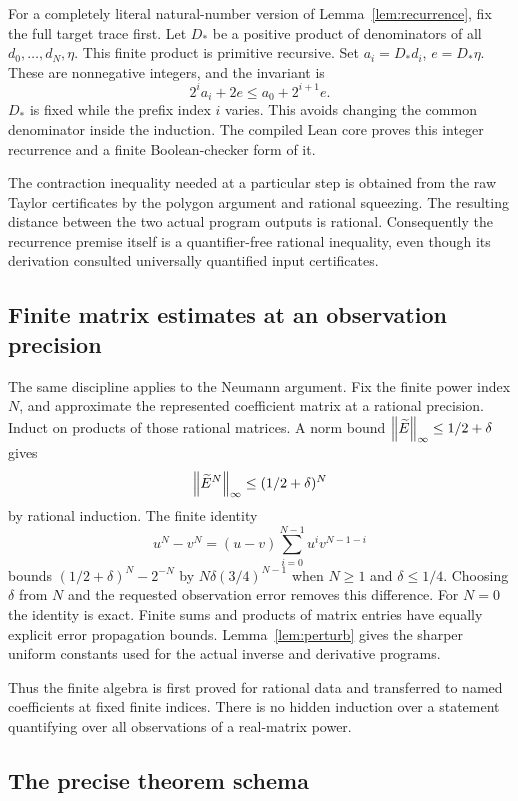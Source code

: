 For a completely literal natural-number version of
Lemma~\ref{lem:recurrence}, fix the full target trace first.
Let \(D_*\) be a positive product of denominators of all
\(d_0,\ldots,d_N,\eta\). This finite product is primitive
recursive. Set \(a_i=D_*d_i\), \(e=D_*\eta\).
These are nonnegative integers, and the invariant is
\[
 2^i a_i+2e\le a_0+2^{i+1}e.
 \tag{Integer invariant}
\]
\(D_*\) is fixed while the prefix index \(i\) varies.
This avoids changing the common denominator inside the
induction. The compiled Lean core proves this integer
recurrence and a finite Boolean-checker form of it.

The contraction inequality needed at a particular step is
obtained from the raw Taylor certificates by the polygon
argument and rational squeezing. The resulting distance
between the two actual program outputs is rational.
Consequently the recurrence premise itself is a
quantifier-free rational inequality, even though its
derivation consulted universally quantified input
certificates.

\subsection{Finite matrix estimates at an observation precision}

The same discipline applies to the Neumann argument.
Fix the finite power index \(N\), and approximate the
represented coefficient matrix at a rational precision.
Induct on products of those rational matrices. A norm
bound \(\left\lVert\widetilde E\right\rVert_\infty\le1/2+\delta\) gives
\[
 \left\lVert\widetilde E^N\right\rVert_\infty\le(1/2+\delta)^N
\]
by rational induction. The finite identity
\[
 u^N-v^N=(u-v)\sum_{i=0}^{N-1}u^i v^{N-1-i}
\]
bounds \((1/2+\delta)^N-2^{-N}\) by
\(N\delta(3/4)^{N-1}\) when \(N\ge1\) and
\(\delta\le1/4\). Choosing \(\delta\) from \(N\) and the
requested observation error removes this difference.
For \(N=0\) the identity is exact.
Finite sums and products of matrix entries have equally
explicit error propagation bounds. Lemma~\ref{lem:perturb}
gives the sharper uniform constants used for the actual
inverse and derivative programs.

Thus the finite algebra is first proved for rational data
and transferred to named coefficients at fixed finite
indices. There is no hidden induction over a statement
quantifying over all observations of a real-matrix power.

\subsection{The precise theorem schema}

